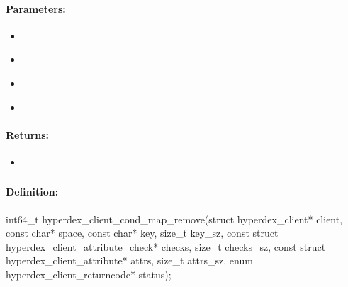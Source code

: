 \paragraph{Parameters:}
\begin{itemize}[noitemsep]
\item {}\\

\item {}\\

\item {}\\

\item {}\\

\end{itemize}

\paragraph{Returns:}
\begin{itemize}[noitemsep]
\item {}\\

\end{itemize}

\pagebreak
\subsubsection{}
\label{api:c:cond_map_remove}


\paragraph{Definition:}
\begin{ccode}
int64_t hyperdex_client_cond_map_remove(struct hyperdex_client* client,
        const char* space,
        const char* key, size_t key_sz,
        const struct hyperdex_client_attribute_check* checks, size_t checks_sz,
        const struct hyperdex_client_attribute* attrs, size_t attrs_sz,
        enum hyperdex_client_returncode* status);
\end{ccode}


